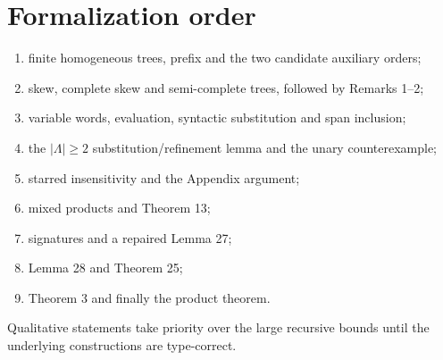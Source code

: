 \documentclass[11pt]{article}
\begin{document}
\section{Formalization order}
\begin{enumerate}
\item finite homogeneous trees, prefix and the two candidate auxiliary orders;
\item skew, complete skew and semi-complete trees, followed by Remarks 1--2;
\item variable words, evaluation, syntactic substitution and span inclusion;
\item the $|\Lambda|\ge2$ substitution/refinement lemma and the unary
counterexample;
\item starred insensitivity and the Appendix argument;
\item mixed products and Theorem 13;
\item signatures and a repaired Lemma 27;
\item Lemma 28 and Theorem 25;
\item Theorem 3 and finally the product theorem.
\end{enumerate}

Qualitative statements take priority over the large recursive bounds until the
underlying constructions are type-correct.
\end{document}
